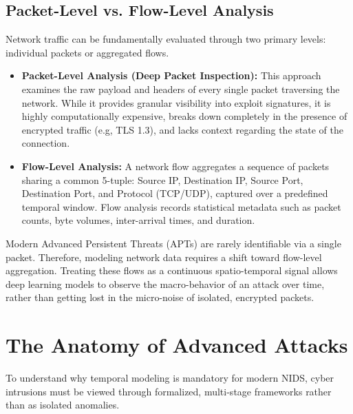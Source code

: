 \documentclass[12pt, a4paper]{report}
\begin{document}
\subsection{Packet-Level vs. Flow-Level Analysis}
Network traffic can be fundamentally evaluated through two primary levels: individual packets or aggregated flows.
\begin{itemize}
    \item \textbf{Packet-Level Analysis (Deep Packet Inspection):} This approach examines the raw payload and headers of every single packet traversing the network. While it provides granular visibility into exploit signatures, it is highly computationally expensive, breaks down completely in the presence of encrypted traffic (e.g, TLS 1.3), and lacks context regarding the state of the connection.
    \item \textbf{Flow-Level Analysis:} A network flow aggregates a sequence of packets sharing a common 5-tuple: Source IP, Destination IP, Source Port, Destination Port, and Protocol (TCP/UDP), captured over a predefined temporal window. Flow analysis records statistical metadata such as packet counts, byte volumes, inter-arrival times, and duration.
\end{itemize}
Modern Advanced Persistent Threats (APTs) are rarely identifiable via a single packet. Therefore, modeling network data requires a shift toward flow-level aggregation. Treating these flows as a continuous spatio-temporal signal allows deep learning models to observe the macro-behavior of an attack over time, rather than getting lost in the micro-noise of isolated, encrypted packets.

\section{The Anatomy of Advanced Attacks}
To understand why temporal modeling is mandatory for modern NIDS, cyber intrusions must be viewed through formalized, multi-stage frameworks rather than as isolated anomalies.
\end{document}
